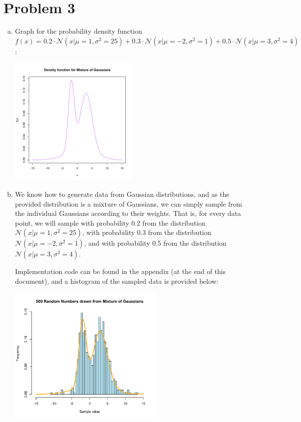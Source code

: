 \documentclass{article}
\begin{document}
    \section*{Problem 3}
        \begin{enumerate}[(a)]
            \item
                Graph for the probability density function $f(x)=0.2\cdot\mathcal{N}(x|\mu=1,\sigma^2=25)+0.3\cdot\mathcal{N}(x|\mu=-2,\sigma^2=1)+0.5\cdot\mathcal{N}(x|\mu=3,\sigma^2=4)$:
                \begin{center}
                    \includegraphics[width=0.5\textwidth]{graph-3.pdf}
                \end{center}
            \item
                We know how to generate data from Gaussian distributions, and as the provided distribution is a mixture of Gaussians, we can simply sample from the individual Gaussians according to their weights. That is, for every data point, we will sample with probability 0.2 from the distribution $\mathcal{N}(x|\mu=1,\sigma^2=25)$, with probability 0.3 from the distribution $\mathcal{N}(x|\mu=-2,\sigma^2=1)$, and with probability 0.5 from the distribution $\mathcal{N}(x|\mu=3,\sigma^2=4)$.

                Implementation code can be found in the appendix (at the end of this document), and a histogram of the sampled data is provided below:

                \begin{center}
                    \includegraphics[width=0.6\textwidth]{graph3b}
                \end{center}


\end{enumerate}
\end{document}
